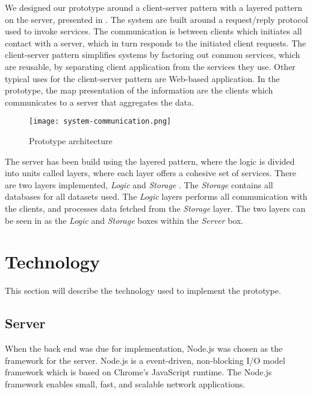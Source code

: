 We designed our prototype around a client-server pattern \cite[pp. 217-219]{Bass:2012:SAP:2392670} with a layered
pattern \cite[pp. 205-210]{Bass:2012:SAP:2392670} on the server, presented in . The 
system are built around a request/reply protocol used to invoke services. The
communication is between clients which initiates all contact with 
a server, which in turn responds to the initiated client requests. The
client-server pattern simplifies systems by factoring out common services,
which are reusable, by separating client application from the services they
use. Other typical uses for the client-server pattern are Web-based
application. In the prototype, the map presentation of the information are the 
clients which communicates to a server that aggregates the data. \\

\begin{figure}[!htbp]
	\texttt{[image: system-communication.png]}
	\caption[Prototype architecture]{Prototype architecture}
	\label{fig:prototype_architecture}
\end{figure}


The server has been build using the layered pattern, where the logic is 
divided into units called layers, where each layer offers a cohesive set of 
services. There are two layers implemented, \textit{Logic} and \textit{Storage}
. The \textit{Storage} contains all databases for all datasets used. The 
\textit{Logic} layers performs all communication with the clients, and 
processes data fetched from the \textit{Storage} layer. The two layers can be 
seen in  as the \textit{Logic} and 
\textit{Storage} boxes within the \textit{Server} box.




\section{Technology} %
This section will describe the technology used to implement the prototype.
\label{sec:technology}

\subsection{Server} %
\label{sub:server}
When the back end was due for implementation, Node.js\cite{nodeJs} was chosen 
as the framework for the server. Node.js is a event-driven, non-blocking  I/O
model framework which is based on Chrome's\cite{chromeJavaScriptEngine} 
JavaScript runtime. The Node.js framework enables small, fast, and scalable 
network applications.

